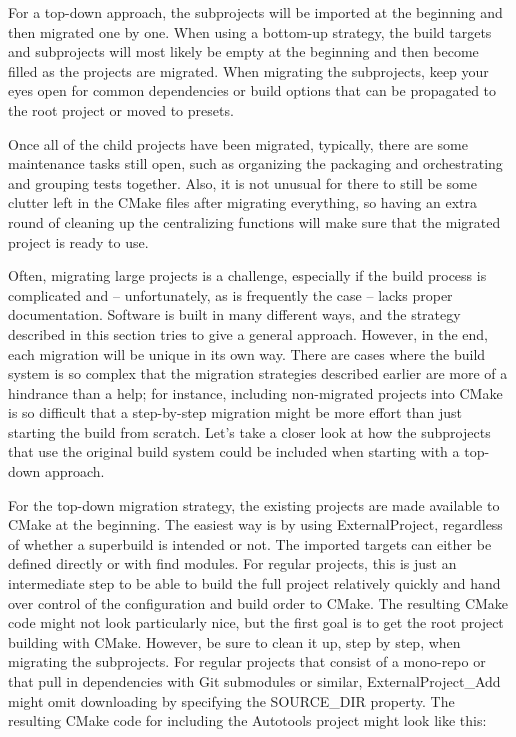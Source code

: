 For a top-down approach, the subprojects will be imported at the beginning and then migrated one by one. When using a bottom-up strategy, the build targets and subprojects will most likely be empty at the beginning and then become filled as the projects are migrated. When migrating the subprojects, keep your eyes open for common dependencies or build options that can be propagated to the root project or moved to presets.

Once all of the child projects have been migrated, typically, there are some maintenance tasks still open, such as organizing the packaging and orchestrating and grouping tests together. Also, it is not unusual for there to still be some clutter left in the CMake files after migrating everything, so having an extra round of cleaning up the centralizing functions will make sure that the migrated project is ready to use.

Often, migrating large projects is a challenge, especially if the build process is complicated and – unfortunately, as is frequently the case – lacks proper documentation. Software is built in many different ways, and the strategy described in this section tries to give a general approach. However, in the end, each migration will be unique in its own way. There are cases where the build system is so complex that the migration strategies described earlier are more of a hindrance than a help; for instance, including non-migrated projects into CMake is so difficult that a step-by-step migration might be more effort than just starting the build from scratch. Let's take a closer look at how the subprojects that use the original build system could be included when starting with a top-down approach.


For the top-down migration strategy, the existing projects are made available to CMake at the beginning. The easiest way is by using ExternalProject, regardless of whether a superbuild is intended or not. The imported targets can either be defined directly or with find modules. For regular projects, this is just an intermediate step to be able to build the full project relatively quickly and hand over control of the configuration and build order to CMake. The resulting CMake code might not look particularly nice, but the first goal is to get the root project building with CMake. However, be sure to clean it up, step by step, when migrating the subprojects. For regular projects that consist of a mono-repo or that pull in dependencies with Git submodules or similar, ExternalProject\_Add might omit downloading by specifying the SOURCE\_DIR property. The resulting CMake code for including the Autotools project might look like this:


